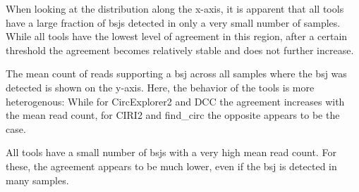 When looking at the distribution along the x-axis, it is apparent that all
tools have a large fraction of \gls{bsj}s detected in only a very small number
of samples.
While all tools have the lowest level of agreement in this region, after a
certain threshold the agreement becomes relatively stable and does not further
increase.

The mean count of reads supporting a \gls{bsj} across all samples where the
\gls{bsj} was detected is shown on the y-axis.
Here, the behavior of the tools is more heterogenous: While for CircExplorer2
and DCC the agreement increases with the mean read count, for CIRI2 and
find\_circ the opposite appears to be the case.

All tools have a small number of \gls{bsj}s with a very high mean read count.
For these, the agreement appears to be much lower, even if the \gls{bsj} is
detected in many samples.

